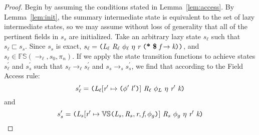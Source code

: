 \begin{proof}
Begin by assuming the conditions stated in Lemma~\ref{lem:access}. By Lemma~\ref{lem:init}, the summary intermediate state is equivalent to the set of lazy intermediate states, so we may assume without loss of generality that all of the pertinent fields in $s_s$ are initialized. Take an arbitrary lazy state $s_\ell$ such that $s_\ell \sqsubset s_s$. Since $s_s$ is exact,  $s_\ell = \lp \cfgnt{L}_{\ell}\ \cfgnt{R}_{\ell}\ \phi_\ell\ \eta\ \cfgnt{r}\ \lp \cfgt{*}\ \cfgt{\$}\ \cfgnt{f} \rightarrow \cfgnt{k} \rp \rp$, and $s_\ell \in \mathbb{FS}(\rightarrow_{\ell},s_0,\pi_n)$. If we apply the state transition functions to achieve states $s_\ell^\prime$ and $s_s^\prime$ such that $s_\ell \rightarrow_\ell s_\ell^\prime$ and  $s_s \rightarrow_s s_s^\prime$, we find that according to the Field Access rule:
$$s_\ell^\prime = \lp \cfgnt{L}_{\ell} [\cfgnt{r}^\prime \mapsto \lp\phi^\prime\ l^\prime\rp]\ \cfgnt{R}_{\ell}\ \phi_L\ \eta\ \cfgnt{r}^\prime\ \cfgnt{k}\rp $$
 and 
 $$ s_s^\prime = \lp \cfgnt{L}_{s}[\cfgnt{r}^\prime \mapsto \mathbb{VS}\lp \cfgnt{L}_{s},\cfgnt{R}_{s},\cfgnt{r},\cfgnt{f},\phi_g\rp ]\ \cfgnt{R}_{s}\ \phi_g\ \eta\ \cfgnt{r}^\prime\ \cfgnt{k}\rp $$


\end{proof}
